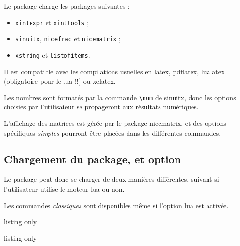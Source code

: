 \documentclass[a4paper,11pt]{article}
\begin{document}
\begin{noteblock}
Le package charge les packages suivantes :

\begin{itemize}
	\item \texttt{xintexpr} et \texttt{xinttools} ;
	\item \texttt{sinuitx}, \texttt{nicefrac} et \texttt{nicematrix} ;
	\item \texttt{xstring} et \texttt{listofitems}.
\end{itemize}

Il est compatible avec les compilations usuelles en \textsf{latex}, \textsf{pdflatex}, \textsf{lualatex} (obligatoire pour le \textsf{lua} !!) ou \textsf{xelatex}.
\end{noteblock}

\begin{importantblock}
Les nombres sont formatés par la commande \texttt{\textbackslash num} de \textsf{sinuitx}, donc les options choisies par l'utilisateur se propageront aux résultats numériques.

\smallskip

L'affichage des matrices est gérée par le package \textsf{nicematrix}, et des options spécifiques \textit{simples} pourront être placées dans les différentes commandes.
\end{importantblock}

\subsection{Chargement du package, et option}

\begin{importantblock}
Le package peut donc se charger de deux manières différentes, suivant si l'utilisateur utilise le moteur \textsf{lua} ou non.

Les commandes \textit{classiques} sont disponibles même si l'option \textsf{lua} est activée.
\end{importantblock}

\begin{PresentationCode}{listing only}
\usepackage{ResolSysteme}
\end{PresentationCode}

\begin{PresentationCode}{listing only}
\usepackage[options]{pyluatex}
\usepackage[lua]{ResolSysteme}
\end{PresentationCode}
\end{document}
